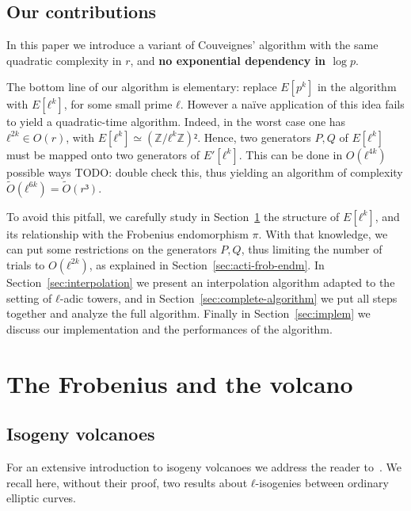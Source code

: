 \documentclass{lms}
\newcommand{\todo}[1]{{\color{red}TODO: #1}}
\newcommand{\tildO}{\tilde{O}}
\begin{document}
\subsection{Our contributions}

In this paper we
introduce a variant of Couveignes' algorithm with the same quadratic
complexity in $r$, and \textbf{no exponential dependency in $\log p$}.

The bottom line of our algorithm is elementary: replace $E[p^k]$ in
the algorithm with $E[ℓ^k]$, for some small prime $ℓ$. However a
naïve application of this idea fails to yield a quadratic-time
algorithm. Indeed, in the worst case one has $ℓ^{2k}∈O(r)$, with
$E[ℓ^k]≃(ℤ/ℓ^kℤ)²$. Hence, two generators $P,Q$ of $E[ℓ^k]$ must
be mapped onto two generators of $E'[ℓ^k]$. This can be done in
$O(ℓ^{4k})$ possible ways \todo{double check this}, thus yielding an
algorithm of complexity $\tildO(ℓ^{6k})=\tildO(r³)$.

To avoid this pitfall, we carefully study
in Section~\ref{sec:isogeny-volcanoes} the structure of
$E[ℓ^k]$, and its relationship with the Frobenius endomorphism $π$.
With that knowledge, we can put some restrictions on the generators $P,Q$,
thus limiting the number of trials to $O(ℓ^{2k})$,
as explained in Section~\ref{sec:acti-frob-endm}.
In Section~\ref{sec:interpolation}
we present an interpolation algorithm adapted to the setting of
$ℓ$-adic towers, and in Section~\ref{sec:complete-algorithm} we put
all steps together and analyze the full algorithm. Finally in
Section~\ref{sec:implem} we discuss our implementation and the
performances of the algorithm.



\section{The Frobenius and the volcano}
\label{sec:isogeny-volcanoes}
\subsection{Isogeny volcanoes}

For an extensive introduction to isogeny volcanoes we address the
reader to~\cite{sutherland2013isogeny}.  We recall here, without their
proof, two results about $ℓ$-isogenies between ordinary elliptic
curves.
\end{document}
